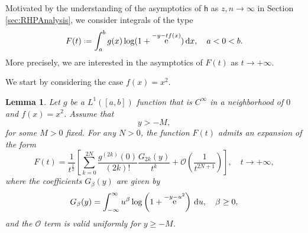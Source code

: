\documentclass[reqno,a4paper,11pt]{amsart}
\DeclareMathOperator{\ee}{\rm e}
\newcommand{\Boh}{\mathcal{O}}
\newcommand{\dd}{\mathrm{d}}
\newcommand{\msf}{\mathsf}
\newtheorem{lemma}[theorem]{Lemma}
\theoremstyle{definition}
\theoremstyle{remark}
\numberwithin{equation}{section}
\newcommand*{\defeq}{\mathrel{\vcenter{\baselineskip0.5ex \lineskiplimit0pt
                     \hbox{\scriptsize.}\hbox{\scriptsize.}}}%
                     =}
\begin{document}
Motivated by the understanding of the asymptotics of $\msf h$ as $z,n \to \infty$ in Section \ref{sec:RHPAnalysis}, we consider integrals of the type
\[
    F(t) \defeq \int_a^b g(x) \log(1 + \ee^{-y - t f(x)}) \, \dd x, \quad a < 0 < b.
\]
More precisely, we are interested in the asymptotics  of $F(t)$ as $t \to +\infty$.

    We start by considering the case $f(x) = x^2$.

\begin{lemma}\label{lem:Laplace}
    Let $g$ be a $L^1([a,b])$ function that is $C^\infty$ in a neighborhood of $0$ and $f(x) = x^2$. Assume that
    \begin{equation}
        y > -M,
    \end{equation}
    for some $M > 0$ fixed. For any $N>0$, the function $F(t)$ admits an expansion of the form
    \begin{equation}\label{eq:LaplaceExpformula}
        F(t) = \frac{1}{t^{\frac{1}{2} }} \left[ \sum_{k=0}^{2N } \frac{g^{(2k)}(0)}{(2k)!} \frac{G_{2k}(y)}{t^{k}} + \Boh \left( \frac{1}{t^{2N+1}}\right) \right], \quad t \to +\infty,
    \end{equation}
    where the coefficients $G_\beta(y)$ are given by
    \[
        G_\beta(y) = \int_{- \infty}^\infty u^\beta \log \left( 1 + \ee^{-y - u^2} \right) \, \dd u, \quad \beta \geq 0,
    \]
    and the $\Boh$ term is valid uniformly for $y \geq -M$.
\end{lemma}
\end{document}
